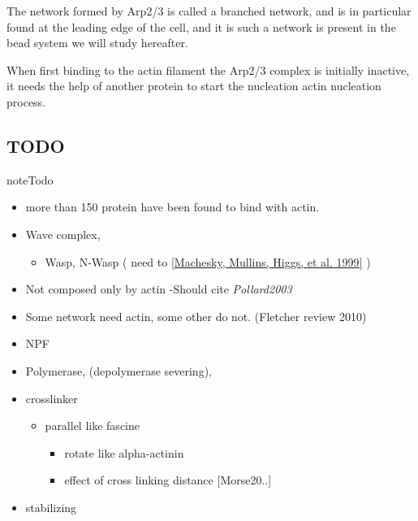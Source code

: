 \documentclass[A4paperpaper,11pt,english]{sphinxmanual}
\begin{document}
The network formed by Arp2/3 is called a branched network, and is in particular
found at the leading edge of the cell, and it is such a network is present in
the bead system we will study hereafter.

When first binding to the actin filament the Arp2/3 complex is initially inactive, it
needs the help of another protein to start the nucleation actin nucleation process.


\subsection{TODO}
\label{parts/part1:todo}
\begin{notice}{note}{Todo}
\begin{itemize}
\item {} 
more than 150 protein have been found to bind with actin.

\item {} 
Wave complex,
\begin{itemize}
\item {} 
Wasp, N-Wasp ( need to {\hyperref[bibitem:machesky1999]{{[}Machesky, Mullins, Higgs,  et al.  1999{]}}} )

\end{itemize}

\item {} 
Not composed only by actin
-Should cite \emph{Pollard2003}

\item {} 
Some network need actin, some other do not. (Fletcher review 2010)

\item {} 
NPF

\item {} 
Polymerase, (depolymerase severing),

\item {} 
crosslinker
\begin{itemize}
\item {} 
parallel like fascine
\begin{itemize}
\item {} 
rotate like alpha-actinin

\item {} 
effect of cross linking distance {[}Morse20..{]}

\end{itemize}

\end{itemize}

\item {} 
stabilizing


\end{itemize}
\end{notice}
\end{document}
